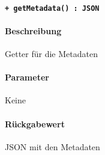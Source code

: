 \paragraph{\texttt{+ getMetadata() : JSON}}\label{AP_ChangeAction_getMetadata}%
\paragraph*{Beschreibung}
Getter für die Metadaten
\paragraph*{Parameter}
Keine
\paragraph*{Rückgabewert}
JSON mit den Metadaten